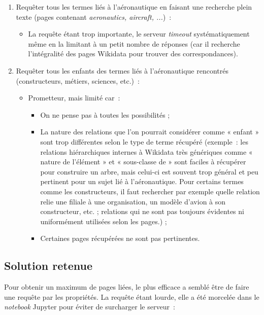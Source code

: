 \begin{enumerate}
	\item Requêter tous les termes liés à l'aéronautique en faisant une recherche plein texte (pages contenant \textit{aeronautics, aircraft, ...})~:
	\begin{itemize}
		\item La requête étant trop importante, le serveur \textit{timeout} systématiquement même en la limitant à un petit nombre de réponses (car il recherche l'intégralité des pages Wikidata pour trouver des correspondances).
	\end{itemize}
	
	\item Requêter tous les enfants des termes liés à l'aéronautique rencontrés (constructeurs, métiers, sciences, etc.)~:
	\begin{itemize}
		\item Prometteur, mais limité car~:
		\begin{itemize}
			\item On ne pense pas à toutes les possibilités ;
			\item La nature des relations que l'on pourrait considérer comme « enfant » sont trop différentes selon le type de terme récupéré (exemple~: les relations hiérarchiques internes à Wikidata très génériques comme « nature de l'élément » et « sous-classe de » sont faciles à récupérer pour construire un arbre, mais celui-ci est souvent trop général et peu pertinent pour un sujet lié à l'aéronautique. Pour certains termes comme les constructeurs, il faut rechercher par exemple quelle relation relie une filiale à une organisation, un modèle d'avion à son constructeur, etc. ; relations qui ne sont pas toujours évidentes ni uniformément utilisées selon les pages.) ;
			\item Certaines pages récupérées ne sont pas pertinentes.
		\end{itemize}
	\end{itemize}
\end{enumerate}

\subsection*{Solution retenue}

Pour obtenir un maximum de pages liées, le plus efficace a semblé être de faire une requête par les propriétés. La requête étant lourde, elle a été morcelée dans le \textit{notebook} Jupyter pour éviter de surcharger le serveur~:

